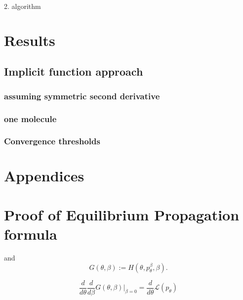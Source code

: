\documentclass[a4paper,10pt]{report}
\begin{document}
2. algorithm
\section{Results}
\subsection{Implicit function approach}
\subsubsection{assuming symmetric second derivative}
\subsubsection{one molecule}
\subsubsection{Convergence thresholds}

\nocite{*}




\section{Appendices}
\appendix
\section{Proof of Equilibrium Propagation formula}
and
\begin{equation}
 G(\theta, \beta) := H(\theta, p_\theta^\beta, \beta).
\end{equation}

\begin{equation}
 \frac{d}{d\theta}\frac{d}{d\beta}G(\theta,\beta)\big|_{\beta=0} = \frac{d}{d\theta} \mathcal{L}(p_\theta)
\end{equation}
\end{document}
